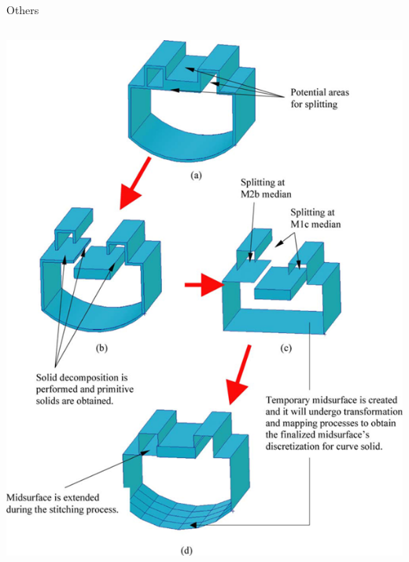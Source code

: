 \begin{frame}[<+-| alert@+>]{Others}
\begin{columns}[T]
	\includegraphics[width=0.9\linewidth]{../Common/images/Chong.png}
\end{columns}

\end{frame}

